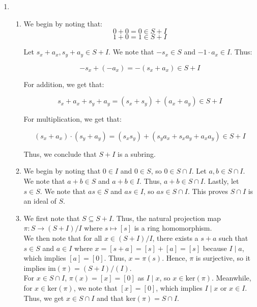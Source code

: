 \documentclass{article}
\begin{document}
\begin{enumerate}

\item 

\begin{enumerate}
    \item 
    We begin by noting that: 
    $$0 + 0 = 0 \in S + I$$
    $$1 + 0 = 1 \in S + I$$

    Let $s_x + a_x, s_y + a_y \in S + I$. We note that $-s_x \in S$ and $-1 \cdot a_x \in I$. Thus: 

    $$-s_x + (-a_x) = -(s_x + a_x) \in S + I$$

    For addition, we get that: 

    $$s_x + a_x + s_y + a_y = (s_x + s_y) + (a_x + a_y) \in S + I$$

    For multiplication, we get that: 

    $$(s_x + a_x) \cdot (s_y + a_y) = (s_x s_y) + (s_ya_x + s_x a_y + a_x a_y) \in S + I$$

    Thus, we conclude that $S + I$ is a subring. \\

    \item
    We begin by noting that $0 \in I$ and $0 \in S$, so $0 \in S \cap I$. Let $a, b \in S \cap I$. We note that $a + b \in S$ and $a + b \in I$. Thus, $a + b \in S \cap I$. Lastly, let $s \in S$. We note that $as \in S$ and $as \in I$, so $as \in S \cap I$. This proves $S \cap I$ is an ideal of $S$. \\


    \item 
    We first note that $S \subseteq S + I$. Thus, the natural projection map $\pi: S \rightarrow (S+ I)/I$ where $s \mapsto [s]$ is a ring homomorphism. \\
    
    We then note that for all $x \in (S + I)/I$, there exists a $s + a$ such that $s \in S$ and $a \in I$ where $x = [s + a] = [s] + [a] = [s]$ because $I \mid a$, which implies $[a] = [0]$. Thus, $x = \pi (s)$. Hence, $\pi$ is surjective, so it implies $\text{im}(\pi) = (S + I)/(I)$. \\
    
    For $x \in S \cap I$, $\pi(x) = [x] = [0]$ as $I \mid x$, so $x \in \text{ker}(\pi)$. Meanwhile, for $x \in \text{ker}(\pi)$, we note that $[x] = [0]$, which implies $I \mid x$ or $x \in I$. Thus, we get $x \in S \cap I$ and that $\text{ker}(\pi) = S \cap I$. \\
    

\end{enumerate}
\end{enumerate}
\end{document}
